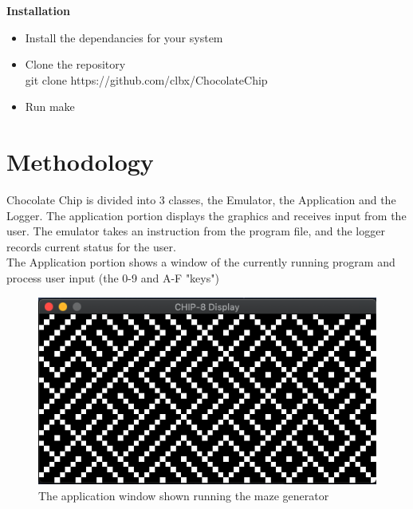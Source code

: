 \documentclass[12pt]{IEEEtran}
\begin{document}
\textbf{Installation}


\begin{itemize}
    \item Install the dependancies for your system
    \item Clone the repository\\ 
    \colorbox{gray!30}{git clone https://github.com/clbx/ChocolateChip}
    \item Run \colorbox{gray!30}{make}
\end{itemize}



\section{Methodology}
Chocolate Chip is divided into 3 classes, the Emulator, the Application and the Logger.
The application portion displays the graphics and receives input from the user. The emulator takes an instruction from the program file, and the logger records current status for the user.
\\
The Application portion shows a window of the currently running program and process user input (the 0-9 and A-F "keys")
\begin{figure}[h]
    \includegraphics[width=\linewidth]{application.png}
    \caption{The application window shown running the maze generator}
\end{figure}
\end{document}
